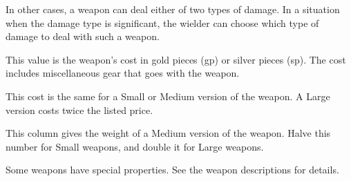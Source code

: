         In other cases, a weapon can deal either of two types of damage. In a situation when the damage type is significant, the wielder can choose which type of damage to deal with such a weapon.

         This value is the weapon's cost in gold pieces (gp) or silver pieces (sp). The cost includes miscellaneous gear that goes with the weapon.
        \par This cost is the same for a Small or Medium version of the weapon. A Large version costs twice the listed price.

         This column gives the weight of a Medium version of the weapon. Halve this number for Small weapons, and double it for Large weapons.

         Some weapons have special properties. See the weapon
            descriptions for details.

